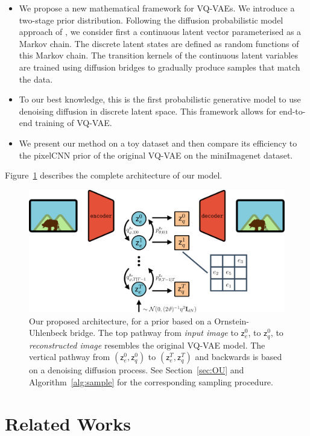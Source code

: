 \documentclass{article}
\theoremstyle{plain}
\theoremstyle{definition}
\theoremstyle{remark}
\newcommand{\latentcont}{\mathsf{z}_e}
\newcommand{\latentdis}{\mathsf{z}_q}
\begin{document}
\begin{itemize}
    \item We propose a new mathematical framework for VQ-VAEs. We introduce a two-stage prior distribution. Following the diffusion probabilistic model approach of \cite{ho2020denoising}, we consider first a continuous latent vector parameterised as a Markov chain. The discrete latent states are defined  as random functions of this Markov chain. The  transition kernels of the continuous latent variables are trained using diffusion bridges to gradually produce samples that match the data.
    \item  To our best knowledge, this is the first probabilistic generative model to use denoising diffusion in discrete latent space. This framework allows for end-to-end training of VQ-VAE.
    \item We present our method on a toy dataset and then compare its efficiency to the pixelCNN prior of the original VQ-VAE on the miniImagenet dataset.
\end{itemize}
Figure~\ref{fig:archi} describes the complete architecture of our model.
\begin{figure}[h]
    \centering
    \includegraphics[width=.8\linewidth]{./Archi.pdf}
    \caption{Our proposed architecture, for a prior based on a Ornstein-Uhlenbeck bridge. The top pathway from \textit{input image} to $\latentcont^0$, to $\latentdis^0$, to \textit{reconstructed image} resembles the original VQ-VAE model. The vertical pathway from $(\latentcont^0, \latentdis^0)$ to $(\latentcont^T, \latentdis^T)$ and backwards is based on a denoising diffusion process. See Section~\ref{sec:OU} and Algorithm~\ref{alg:sample} for the corresponding sampling procedure.}
    \label{fig:archi}
\end{figure}

\section{Related Works}
\end{document}
